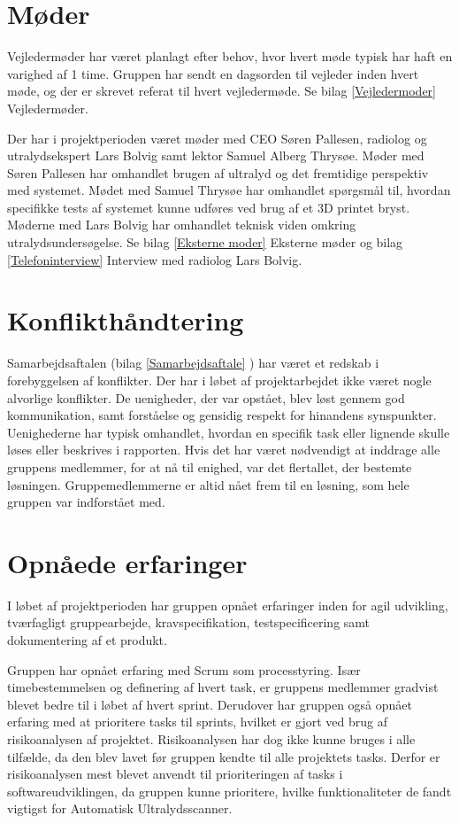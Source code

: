 \section{Møder}
Vejledermøder har været planlagt efter behov, hvor hvert møde typisk har haft en varighed af 1 time. Gruppen har sendt en dagsorden til vejleder inden hvert møde, og der er skrevet referat til hvert vejledermøde. Se bilag \ref{Vejledermoder} Vejledermøder.
 
Der har i projektperioden været møder med CEO Søren Pallesen, radiolog og utralydsekspert Lars Bolvig samt lektor Samuel Alberg Thrysøe. Møder med Søren Pallesen har omhandlet brugen af ultralyd og det fremtidige perspektiv med systemet. Mødet med Samuel Thrysøe har omhandlet spørgsmål til, hvordan specifikke tests af systemet kunne udføres ved brug af et 3D printet bryst. Møderne med Lars Bolvig har omhandlet teknisk viden omkring utralydsundersøgelse. Se bilag \ref{Eksterne moder} Eksterne møder og bilag \ref{Telefoninterview} Interview med radiolog Lars Bolvig. 

\section{Konflikthåndtering}
Samarbejdsaftalen (bilag \ref{Samarbejdsaftale} ) har været et redskab i forebyggelsen af konflikter. Der har i løbet af projektarbejdet ikke været nogle alvorlige konflikter. De uenigheder, der var opstået, blev løst gennem god kommunikation, samt forståelse og gensidig respekt for hinandens synspunkter. Uenighederne har typisk omhandlet, hvordan en specifik task eller lignende skulle løses eller beskrives i rapporten. Hvis det har været nødvendigt at inddrage alle gruppens medlemmer, for at nå til enighed, var det flertallet, der bestemte løsningen. Gruppemedlemmerne er altid nået frem til en løsning, som hele gruppen var indforstået med.

\section{Opnåede erfaringer}
I løbet af projektperioden har gruppen opnået erfaringer inden for agil udvikling, tværfagligt gruppearbejde, kravspecifikation, testspecificering samt dokumentering af et produkt.

Gruppen har opnået erfaring med Scrum som processtyring. Især timebestemmelsen og definering af hvert task, er gruppens medlemmer gradvist blevet bedre til i løbet af hvert sprint. Derudover har gruppen også opnået erfaring med at prioritere tasks til sprints, hvilket er gjort ved brug af risikoanalysen af projektet. Risikoanalysen har dog ikke kunne bruges i alle tilfælde, da den blev lavet før gruppen kendte til alle projektets tasks. Derfor er risikoanalysen mest blevet anvendt til prioriteringen af tasks i softwareudviklingen, da gruppen kunne prioritere, hvilke funktionaliteter de fandt vigtigst for Automatisk Ultralydsscanner. 

